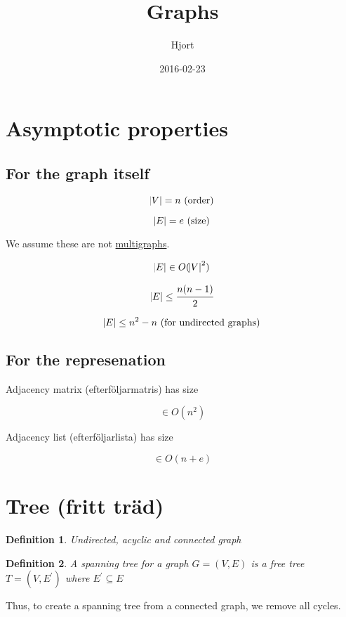 \documentclass{article}
\title{Graphs}
\date{2016-02-23}
\author{Hjort}
\newtheorem{definition}{Definition}
\begin{document}
\maketitle

\section{Asymptotic properties}

  \subsection{For the graph itself}

      $$\abs{V} = n \text{ (order)}$$

      $$\abs{E} = e \text{ (size)}$$

      We assume these are not \href{https://en.wikipedia.org/wiki/Multigraph}{multigraphs}.

      $$ \abs{E} \in O(\abs{V}^2) $$

      $$\abs{E} \leq \cfrac{n(n-1)}{2}$$

      $$\abs{E} \leq n^2 - n \text{ (for undirected graphs)}$$

  \subsection{For the represenation}

      Adjacency matrix (efterföljarmatris) has size 
      
      $$ \in O(n^2)$$

      Adjacency list (efterföljarlista) has size
      
      $$\in O(n + e)$$

\section{Tree (fritt träd)}

  \begin{definition}
      Undirected, acyclic and connected graph
  \end{definition}

  \begin{definition}
      A spanning tree for a graph $G = (V, E)$ is a free tree
      $T=(V,E^{\prime})$ where $E^{\prime} \subseteq E$ 
  \end{definition}

  Thus, to create a spanning tree from a connected graph, we remove all
  cycles.
\end{document}
